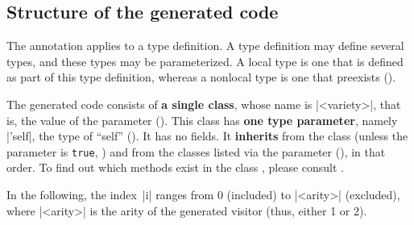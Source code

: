 \documentclass[11pt,a4paper,twoside]{article}
\renewcommand{\emph}[1]{\textbf{#1}}
\begin{document}

\subsection{Structure of the generated code}
\label{sec:structure}

The \derivingvisitors annotation applies to a type definition. A type
definition may define several types, and these types may be parameterized. A
local type is one that is defined as part of this type definition, whereas a
nonlocal type is one that preexists ().

The generated code consists of \emph{a single class}, whose name is \oc|<variety>|,
that is, the value of the \variety parameter (). This class
has \emph{one type parameter}, namely \oc|'self|, the type of ``self''
(). It has no fields. It \emph{inherits} from the class
 (unless the parameter \nude is \texttt{true}, )
and from the classes listed via the \ancestors parameter (),
in that order. To find out which methods exist in the class
, please consult .

In the following, the index~\oc|i| ranges from 0 (included) to \oc|<arity>|
(excluded), where \oc|<arity>| is the arity of the generated visitor (thus,
either 1 or 2).
\end{document}
